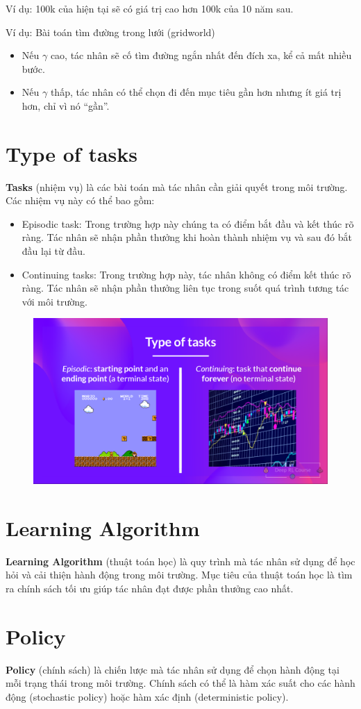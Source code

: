 \documentclass[final,letterpaper,twoside,12pt]{report}
\begin{document}
Ví dụ: 100k của hiện tại sẽ có giá trị cao hơn 100k của 10 năm sau.

Ví dụ: Bài toán tìm đường trong lưới (gridworld)
	\begin{itemize}
		\item Nếu \( \gamma \) cao, tác nhân sẽ cố tìm đường ngắn nhất đến đích xa, kể cả mất nhiều bước.
		\item Nếu \( \gamma \) thấp, tác nhân có thể chọn đi đến mục tiêu gần hơn nhưng ít giá trị hơn, chỉ vì nó “gần”.
	\end{itemize}

\section{Type of tasks}
\textbf{Tasks} (nhiệm vụ) là các bài toán mà tác nhân cần giải quyết trong môi trường. Các nhiệm vụ này có thể bao gồm:
\begin{itemize}
	\item Episodic task: Trong trường hợp này chúng ta có điểm bắt đầu và kết thúc rõ ràng. Tác nhân sẽ nhận phần thưởng khi hoàn thành nhiệm vụ và sau đó bắt đầu lại từ đầu.
	\item Continuing tasks: Trong trường hợp này, tác nhân không có điểm kết thúc rõ ràng. Tác nhân sẽ nhận phần thưởng liên tục trong suốt quá trình tương tác với môi trường.
\end{itemize}

\begin{figure}[h]
	\begin{center}
		\includegraphics[width=1\textwidth]{TypeOfTask.jpg}
	\end{center}
\end{figure}

\section{Learning Algorithm}
\textbf{Learning Algorithm} (thuật toán học) là quy trình mà tác nhân sử dụng để học hỏi và cải thiện hành động trong môi trường. Mục tiêu của thuật toán học là tìm ra chính sách tối ưu giúp tác nhân đạt được phần thưởng cao nhất.

\section{Policy}
\textbf{Policy} (chính sách) là chiến lược mà tác nhân sử dụng để chọn hành động tại mỗi trạng thái trong môi trường. Chính sách có thể là hàm xác suất cho các hành động (stochastic policy) hoặc hàm xác định (deterministic policy).
\end{document}
